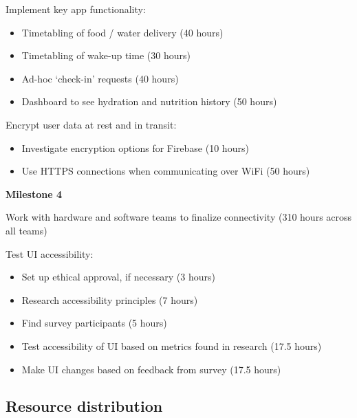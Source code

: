 \documentclass{article}
\begin{document}
Implement key app functionality:
\begin{itemize}
\item Timetabling of food / water delivery (40 hours)
\item Timetabling of wake-up time (30 hours)
\item Ad-hoc `check-in' requests (40 hours)
\item Dashboard to see hydration and nutrition history (50 hours)
\end{itemize}

Encrypt user data at rest and in transit:
\begin{itemize}
\item Investigate encryption options for Firebase (10 hours)
\item Use HTTPS connections when communicating over WiFi (50 hours)
\end{itemize}

{\bf Milestone 4}

Work with hardware and software teams to finalize connectivity (310 hours across all teams)

Test UI accessibility:
\begin{itemize}
\item Set up ethical approval, if necessary (3 hours)
\item Research accessibility principles (7 hours)
\item Find survey participants (5 hours)
\item Test accessibility of UI based on metrics found in research (17.5 hours)
\item Make UI changes based on feedback from survey (17.5 hours)
\end{itemize}

\subsection{Resource distribution}
\end{document}
